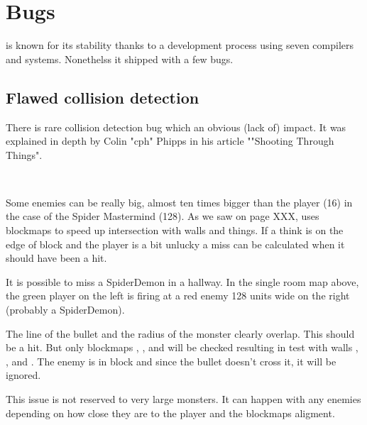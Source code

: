\section{Bugs}
\doom is known for its stability thanks to a development process using seven compilers and systems. Nonethelss it shipped with a few bugs.








\subsection{Flawed collision detection}
There is rare collision detection bug which an obvious (lack of) impact. It was explained in depth by Colin "cph" Phipps in his article ""Shooting Through Things".\\
\par
{}\\
\par
Some enemies can be really big, almost ten times bigger than the player (16) in the case of the Spider Mastermind (128). As we saw on page XXX, \doom uses blockmaps to speed up intersection with walls and things. If a think is on the edge of block and the player is a bit unlucky a miss can be calculated when it should have been a hit.

\vspace{-1cm}


\par
It is possible to miss a SpiderDemon in a hallway. In the single room map above, the green player on the left is firing at a red enemy 128 units wide on the right (probably a SpiderDemon).\\
\par
 The line of the bullet and the radius of the monster clearly overlap. This should be a hit. But only blockmaps , , and  will be checked resulting in test with walls , , and . The enemy is in block  and since the bullet doesn't cross it, it will be ignored.\\
 \par
 This issue is not reserved to very large monsters. It can happen with any enemies depending on how close they are to the player and the blockmaps aligment.

